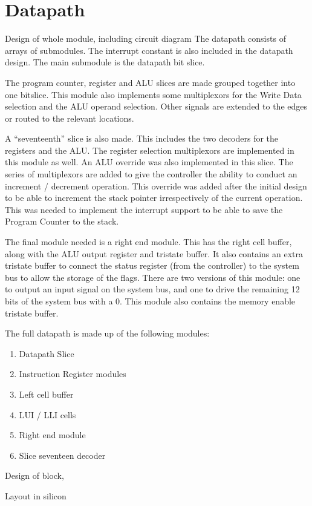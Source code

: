 

\section{Datapath}


Design of whole module, including circuit diagram
The datapath consists of arrays of submodules. 
The interrupt constant is also included in the datapath design.
The main submodule is the datapath bit slice. 

The program counter, register and ALU slices are made grouped together into one bitslice.
This module also implements some multiplexors for the Write Data selection and the ALU operand selection.
Other signals are extended to the edges or routed to the relevant locations. 

A ``seventeenth'' slice is also made. 
This includes the two decoders for the registers and the ALU.
The register selection multiplexors are implemented in this module as well.
An ALU override was also implemented in this slice.
The series of multiplexors are added to give the controller the ability to conduct an increment / decrement operation. 
This override was added after the initial design to be able to increment the stack pointer irrespectively of the current operation.
This was needed to implement the interrupt support to be able to save the Program Counter to the stack.

The final module needed is a right end module.
This has the right cell buffer, along with the ALU output register and tristate buffer.
It also contains an extra tristate buffer to connect the status register (from the controller) to the system bus to allow the storage of the flags.
There are two versions of this module: one to output an input signal on the system bus, and one to drive the remaining 12 bits of the system bus with a 0. 
This module also contains the memory enable tristate buffer.


The full datapath is made up of the following modules:
\begin{enumerate}
\item Datapath Slice
\item Instruction Register modules
\item Left cell buffer
\item LUI / LLI cells
\item Right end module
\item Slice seventeen decoder
\end{enumerate}

Design of block,

Layout in silicon

